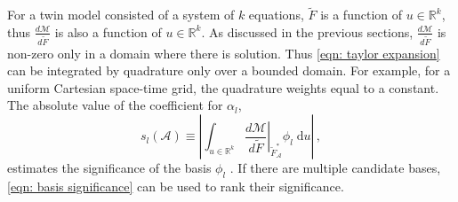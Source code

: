 For a twin model consisted of a system of $k$ equations,
$\tilde{F}$ is a function of $u\in\mathbb{R}^k$, thus 
$\frac{d\mathcal{M}}{d\tilde{F}}$ is also a function of $u\in\mathbb{R}^k$.
As discussed in the previous sections, $\frac{d \mathcal{M}}{d\tilde{F}}$ is non-zero only in a
domain where there is solution. Thus \eqref{eqn: taylor expansion} 
can be integrated by quadrature only over a bounded domain.
For example, for a uniform Cartesian space-time grid, the quadrature weights equal to a constant.
The absolute value of the coefficient for $\alpha_l$,
\begin{equation}
    s_l(\mathcal{A}) \equiv \left|\int_{u\in \mathbb{R}^k} \left.\frac{d\mathcal{M}}{d \tilde{F}}
    \right|_{\tilde{F}_\mathcal{A}^*} \phi_l \; \textrm{d} u \right|\,,
    \label{eqn: basis significance}
\end{equation}
estimates the significance of the basis $\phi_l$ \cite{weight selection}. 
If there are multiple candidate bases, \eqref{eqn: basis significance} can be used to rank their 
significance.\\

